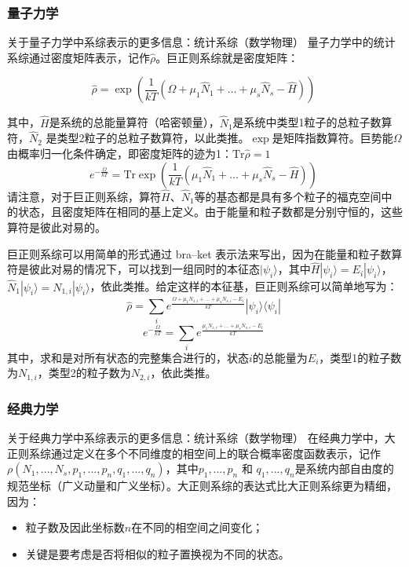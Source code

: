 \subsubsection{量子力学}
关于量子力学中系综表示的更多信息：统计系综（数学物理）
量子力学中的统计系综通过密度矩阵表示，记作\( \hat{\rho} \)。巨正则系综就是密度矩阵：

\[
\hat{\rho} = \exp \left( \frac{1}{kT} \left( \Omega + \mu_1 \hat{N}_1 + \dots + \mu_s \hat{N}_s - \hat{H} \right) \right)~
\]

其中，\( \hat{H} \)是系统的总能量算符（哈密顿量），\( \hat{N}_1 \)是系统中类型1粒子的总粒子数算符，\( \hat{N}_2 \) 是类型2粒子的总粒子数算符，以此类推。\( \exp \)是矩阵指数算符。巨势能\( \Omega \)由概率归一化条件确定，即密度矩阵的迹为1：\(\text{Tr} \hat{\rho} = 1\)
\[
e^{-\frac{\Omega}{kT}} = \text{Tr} \exp \left( \frac{1}{kT} \left( \mu_1 \hat{N}_1 + \dots + \mu_s \hat{N}_s - \hat{H} \right) \right)~
\]
请注意，对于巨正则系综，算符\( \hat{H} \)、\( \hat{N}_1 \)等的基态都是具有多个粒子的福克空间中的状态，且密度矩阵在相同的基上定义。由于能量和粒子数都是分别守恒的，这些算符是彼此对易的。

巨正则系综可以用简单的形式通过 bra–ket 表示法来写出，因为在能量和粒子数算符是彼此对易的情况下，可以找到一组同时的本征态\( |\psi_i \rangle \)，其中\( \hat{H}|\psi_i \rangle = E_i |\psi_i \rangle \)，\( \hat{N}_1 |\psi_i \rangle = N_{1,i} |\psi_i \rangle \)，依此类推。给定这样的本征基，巨正则系综可以简单地写为：
\[
\hat{\rho} = \sum_i e^{\frac{\Omega + \mu_1 N_{1,i} + \dots + \mu_s N_{s,i} - E_i}{kT}} |\psi_i \rangle \langle \psi_i |~
\]
\[
e^{-\frac{\Omega}{kT}} = \sum_i e^{\frac{\mu_1 N_{1,i} + \dots + \mu_s N_{s,i} - E_i}{kT}}~
\]
其中，求和是对所有状态的完整集合进行的，状态\( i \)的总能量为\( E_i \)，类型1的粒子数为\( N_{1,i} \)，类型2的粒子数为\( N_{2,i} \)，依此类推。
\subsubsection{经典力学}  
关于经典力学中系综表示的更多信息：统计系综（数学物理）  
在经典力学中，大正则系综通过定义在多个不同维度的相空间上的联合概率密度函数表示，记作\( \rho(N_1, \dots, N_s, p_1, \dots, p_n, q_1, \dots, q_n) \)，其中\( p_1, \dots, p_n \) 和 \( q_1, \dots, q_n \)是系统内部自由度的规范坐标（广义动量和广义坐标）。大正则系综的表达式比大正则系综更为精细，因为：

\begin{itemize}
\item 粒子数及因此坐标数\( n \)在不同的相空间之间变化；
\item 关键是要考虑是否将相似的粒子置换视为不同的状态。
\end{itemize}


